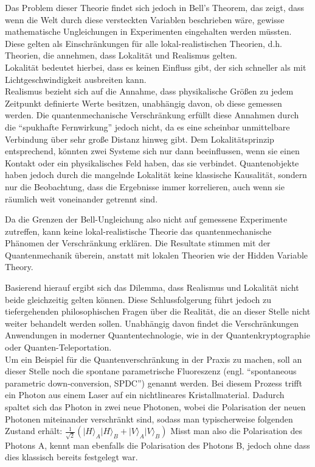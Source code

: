 Das Problem dieser Theorie findet sich jedoch in Bell's Theorem, das zeigt, dass wenn die Welt durch diese versteckten Variablen beschrieben wäre, gewisse mathematische Ungleichungen in Experimenten eingehalten werden müssten. 
Diese gelten als Einschränkungen für alle lokal-realistischen Theorien, d.h. Theorien, die annehmen, dass Lokalität und Realismus gelten. \\
Lokalität bedeutet hierbei, dass es keinen Einfluss gibt, der sich schneller als mit Lichtgeschwindigkeit ausbreiten kann. \\
Realismus bezieht sich auf die Annahme, dass physikalische Größen zu jedem Zeitpunkt definierte Werte besitzen, unabhängig davon, ob diese gemessen werden. 
Die quantenmechanische Verschränkung erfüllt diese Annahmen durch die ``spukhafte Fernwirkung'' jedoch nicht, da es eine scheinbar unmittelbare Verbindung über sehr große Distanz hinweg gibt. Dem Lokalitätsprinzip entsprechend, könnten zwei Systeme sich nur dann beeinflussen, wenn sie einen Kontakt oder ein physikalisches Feld haben, das sie verbindet. Quantenobjekte haben jedoch durch die mangelnde Lokalität keine klassische Kausalität, sondern nur die Beobachtung, dass die Ergebnisse immer korrelieren, auch wenn sie räumlich weit voneinander getrennt sind.

Da die Grenzen der Bell-Ungleichung also nicht auf gemessene Experimente zutreffen, kann keine lokal-realistische Theorie das quantenmechanische Phänomen der Verschränkung erklären. Die Resultate stimmen mit der Quantenmechanik überein, anstatt mit lokalen Theorien wie der Hidden Variable Theory. 

Basierend hierauf ergibt sich das Dilemma, dass Realismus und Lokalität nicht beide gleichzeitig gelten können. Diese Schlussfolgerung führt jedoch zu tiefergehenden philosophischen Fragen über die Realität, die an dieser Stelle nicht weiter behandelt werden sollen.
Unabhängig davon findet die Verschränkungen Anwendungen in moderner Quantentechnologie, wie in der Quantenkryptographie oder Quanten-Teleportation.  
\cite{homeister_quantum_2022}
\\

Um ein Beispiel für die Quantenverschränkung in der Praxis zu machen, soll an dieser Stelle noch  die spontane parametrische Fluoreszenz (engl. ``spontaneous parametric down-conversion, SPDC'') genannt werden. Bei diesem Prozess trifft ein Photon aus einem Laser auf ein nichtlineares Kristallmaterial. Dadurch spaltet sich das Photon in zwei neue Photonen, wobei die Polarisation der neuen Photonen miteinander verschränkt sind, sodass man typischerweise folgenden Zustand erhält:
$\frac{1}{\sqrt{2}} \left( \lvert H \rangle_A \lvert H \rangle_B + \lvert V \rangle_A \lvert V \rangle_B \right)$
Misst man also die Polarisation des Photons A, kennt man ebenfalls die Polarisation des Photons B, jedoch ohne dass dies klassisch bereits festgelegt war.
\cite{hughes_quantum_2021}



